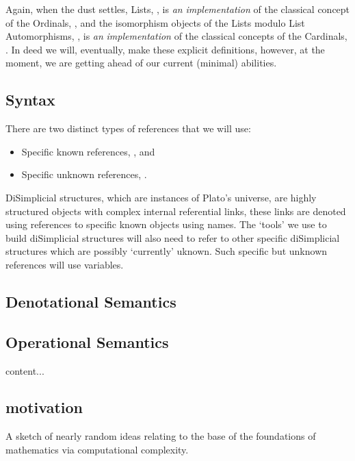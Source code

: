 \documentclass[a4paper,openany]{amsbook}
\begin{document}
Again, when the dust settles, Lists, \Lists, is \emph{an} \emph{implementation}
of the classical concept of the Ordinals, \Ordinal, and the isomorphism objects
of the Lists modulo List Automorphisms, \ListAutomorphisms, is \emph{an}
\emph{implementation} of the classical concepts of the Cardinals, \Cardinal. In
deed we will, eventually, make these explicit definitions, however, at the
moment, we are getting ahead of our current (minimal) abilities.

\subsection{Syntax}

There are two distinct types of references that we will use:
%
\begin{itemize}
\item Specific known references, , and
\item Specific unknown references, .
\end{itemize}
%
DiSimplicial structures, which are instances of Plato's universe, are highly
structured objects with complex internal referential links, these links are
denoted using references to specific known objects using names. The `tools' we
use to build diSimplicial structures will also need to refer to other specific
diSimplicial structures which are possibly `currently' uknown. Such specific but
unknown references will use variables.


\subsection{Denotational Semantics}

\subsection{Operational Semantics}



\begin{definition}
content...
\end{definition}

\subsection{motivation}

A sketch of nearly random ideas relating to the base of the foundations of
mathematics via computational complexity.
\end{document}
